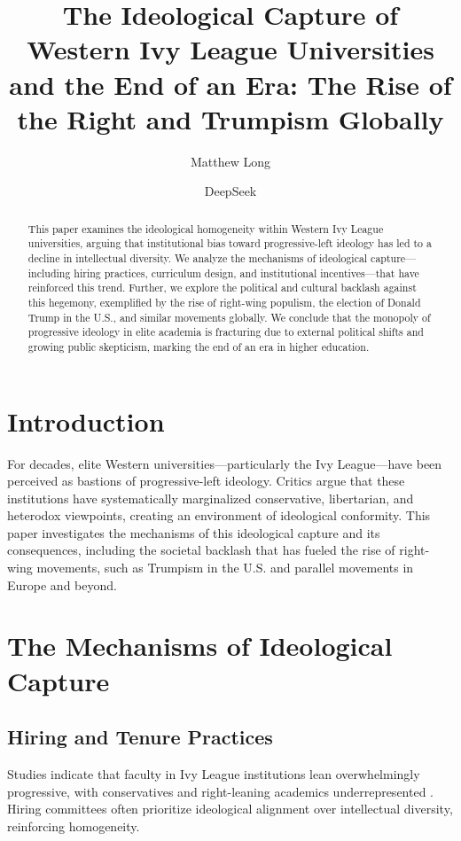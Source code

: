 \documentclass[11pt]{article}
\title{The Ideological Capture of Western Ivy League Universities and the End of an Era: The Rise of the Right and Trumpism Globally}
\author[1]{Matthew Long}
\author[2]{DeepSeek}
\affil[1]{Independent Researcher \\ \texttt{matthewlong@yonedai.com}}
\affil[2]{DeepSeek Research \\ \texttt{research@deepseek.com}}
\begin{document}
\maketitle

\begin{abstract}
    This paper examines the ideological homogeneity within Western Ivy League universities, arguing that institutional bias toward progressive-left ideology has led to a decline in intellectual diversity. We analyze the mechanisms of ideological capture—including hiring practices, curriculum design, and institutional incentives—that have reinforced this trend. Further, we explore the political and cultural backlash against this hegemony, exemplified by the rise of right-wing populism, the election of Donald Trump in the U.S., and similar movements globally. We conclude that the monopoly of progressive ideology in elite academia is fracturing due to external political shifts and growing public skepticism, marking the end of an era in higher education.
\end{abstract}


\section{Introduction}
For decades, elite Western universities—particularly the Ivy League—have been perceived as bastions of progressive-left ideology. Critics argue that these institutions have systematically marginalized conservative, libertarian, and heterodox viewpoints, creating an environment of ideological conformity. This paper investigates the mechanisms of this ideological capture and its consequences, including the societal backlash that has fueled the rise of right-wing movements, such as Trumpism in the U.S. and parallel movements in Europe and beyond.

\section{The Mechanisms of Ideological Capture}
\subsection{Hiring and Tenure Practices}
Studies indicate that faculty in Ivy League institutions lean overwhelmingly progressive, with conservatives and right-leaning academics underrepresented \cite{Gross2016}. Hiring committees often prioritize ideological alignment over intellectual diversity, reinforcing homogeneity.
\end{document}
